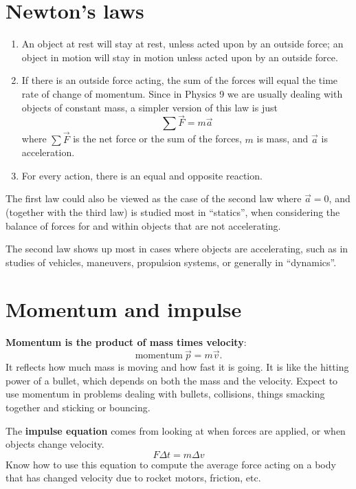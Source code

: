 \documentclass [handout]{tufte-handout}
\begin{document}
\section{Newton's laws}
\begin{enumerate}
\item An object at rest will stay at rest, unless acted upon by an outside force; an object in motion will stay in motion unless acted upon by an outside force. 
\item If there is an outside force acting, the sum of the forces will equal the time rate of change of momentum. Since in Physics 9 we are usually dealing with objects of constant mass, a simpler version of this law is just
\begin{equation}
\sum\vec{F} = m \vec{a} 
\end{equation}
where $\sum\vec{F}$ is the net force or the sum of the forces, $m$ is mass, and $\vec{a}$ is acceleration. 
\item For every action, there is an equal and opposite reaction. 
\end{enumerate}

The first law could also be viewed as the case of the second law where $\vec{a}=0$, and (together with the third law) is studied most in ``statics'', when considering the balance of forces for and within objects that are not accelerating. 

The second law shows up most in cases where objects are accelerating, such as in studies of vehicles, maneuvers, propulsion systems, or generally in ``dynamics''. 


\section{Momentum and impulse}
\textbf{Momentum is the product of mass times velocity}:
\begin{equation*}
\text{momentum}\ \vec{p} = m \vec{v}.
\end{equation*}
It reflects how much mass is moving and how fast it is going. It is like the hitting power of a bullet, which depends on both the mass and the velocity. Expect to use momentum in problems dealing with bullets, collisions, things smacking together and sticking or bouncing. 

The \textbf{impulse equation} comes from looking at when forces are applied, or when objects change velocity. 
\begin{equation*}
F \Delta t = m \Delta v
\end{equation*}
Know how to use this equation to compute the average force acting on a body that has changed velocity due to rocket motors, friction, etc. 
\end{document}
